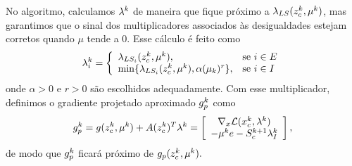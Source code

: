No algoritmo, calculamos $\lambda^{k}$ de maneira que fique pr\'oximo a
$\lambda_{LS}(z_c^{k} ,\mu^k)$, mas garantimos que o sinal dos multiplicadores
associados \`as desigualdades estejam corretos quando $\mu$ tende a $0$. 
Esse c\'alculo \'e feito como
\begin{equation}\visiblelbl{def:lambda}
  \lambda_i^k = \left\{
    \begin{array}{ll}
      \lambda_{LS_i}(\zc{k},\mu^k), & \mbox{se } i \in E \\ 
      \min\{\lambda_{LS_i}(\zc{k},\mu^k), \alpha(\mu_k)^r\}, & \mbox{se } i \in I \\ 
    \end{array}
  \right.
\end{equation}
onde $\alpha > 0$ e $r > 0$ s\~ao escolhidos adequadamente.
Com esse multiplicador, definimos o gradiente projetado aproximado
$g_p^{k}$ como 
\begin{equation} \visiblelbl{def:gpk}
\gpk{k} = g(\zc{k},\mu^k) + A(\zc{k})^T\lk{k}
= \vetor{ \nabla_x\mathcal{L}(x^k_c, \lk{k}) }
{-\mu^ke - S_c^{k+1}\lk{k}_I},
\end{equation}
de modo que $g_p^{k}$ ficar\'a pr\'oximo
de $g_p(z_c^{k},\mu^k).$

